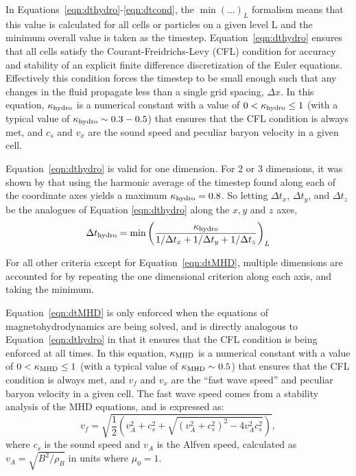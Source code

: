 
In Equations~\ref{eqn:dthydro}-\ref{eqn:dtcond}, the $\min ( \ldots
)_L$ formalism means that this value is calculated for all cells or
particles on a
given level L and the minimum overall value is taken as the timestep.
Equation~\ref{eqn:dthydro} ensures that all cells satisfy the
Courant-Freidrichs-Levy (CFL) condition for accuracy and stability of
an explicit finite difference discretization of the Euler equations.
Effectively this condition forces the timestep to be small enough such
that any changes in the fluid propagate less than a single grid
spacing, $\Delta x$.  In this equation, $\kappa_{\rm hydro}$ is a
numerical constant with a value of $0 < \kappa_{\rm hydro} \leq 1$
(with a typical value of $\kappa_{\rm hydro} \sim 0.3-0.5$) that
ensures that the CFL condition is always met, and $c_s$ and $v_x$ are
the sound speed and peculiar baryon velocity in a given cell.

Equation~\ref{eqn:dthydro} is valid for one dimension.  For 2 or 3
dimensions, it was shown by \cite{Godunov1959}  that using the
harmonic average of the timestep found along each of the coordinate
axes yields a maximum $\kappa_{\rm hydro} = 0.8$.  So letting $\Delta
t_x$, $\Delta t_y$, and $\Delta t_z$ be the analogues of
Equation \ref{eqn:dthydro} along the $x,y$ and $z$ axes, 
\begin{equation}
  \Delta t_{\rm hydro} = \min \left( \frac{\kappa_{\rm hydro}} {1/\Delta t_x
  +1/\Delta t_y + 1/\Delta t_z} \right)_L
\end{equation}

For all other criteria except for Equation~\ref{eqn:dtMHD}, multiple dimensions are accounted for by
repeating the one dimensional criterion along each axis, and taking
the minimum.

Equation~\ref{eqn:dtMHD} is only enforced when the equations of
magnetohydrodynamics are being solved, and is directly analogous to
Equation~\ref{eqn:dthydro} in that it ensures that the CFL condition
is being enforced at all times.  In this equation, $\kappa_{\rm MHD}$ is a
numerical constant with a value of $0 < \kappa_{\rm MHD} \leq 1$ (with a
typical value of $\kappa_{\rm MHD} \sim 0.5$) that ensures that the CFL
condition is always met, and $v_f$ and $v_x$ are the ``fast wave
speed'' and peculiar baryon velocity in a given cell.  The fast wave
speed comes from a stability analysis of the MHD equations, and is
expressed as:
%
\begin{equation}
v_f = \sqrt{ \frac{1}{2} \left(  v_A^2 + c_s^2 + \sqrt{(v_A^2 +
      c_s^2)^2 - 4 v_A^2 c_s^2}  \right)  },
\label{eqn:vfastmhd}
\end{equation}
%
where $c_s$ is the sound speed and $v_A$ is the Alfven speed, calculated
as $v_A = \sqrt{B^2/\rho_B}$ in units where $\mu_0 = 1$.

